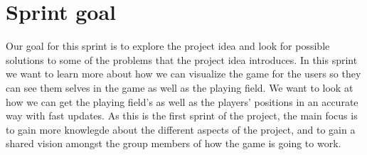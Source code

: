 \section{Sprint goal}
Our goal for this sprint is to explore the project idea and look for possible solutions to some of the problems that the project idea introduces.
In this sprint we want to learn more about how we can visualize the game for the users so they can see them selves in the game as well as the playing field.
We want to look at how we can get the playing field's as well as the players' positions in an accurate way with fast updates.
As this is the first sprint of the project, the main focus is to gain more knowlegde about the different aspects of the project, and to gain a shared vision  amongst the group members of how the game is going to work.